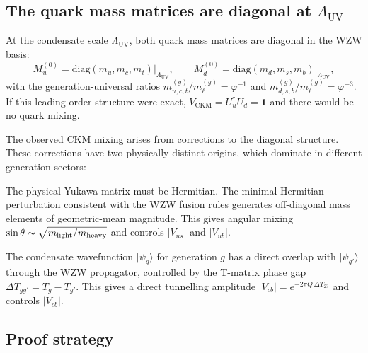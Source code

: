 \documentclass[11pt,a4paper]{article}
\theoremstyle{definition}
\theoremstyle{remark}
\newcommand{\vp}{\varphi}
\newcommand{\LUV}{\Lambda_{\mathrm{UV}}}
\begin{document}
\subsection{The quark mass matrices are diagonal at $\LUV$}
\label{P5:subsec:ckm_diagonal}

At the condensate scale $\LUV$, both quark mass matrices are diagonal
in the WZW basis:
\begin{equation}
  M_u^{(0)} = \mathrm{diag}(m_u,m_c,m_t)\big|_{\LUV}, \qquad
  M_d^{(0)} = \mathrm{diag}(m_d,m_s,m_b)\big|_{\LUV},
  \label{P5:eq:mass_matrices_diag}
\end{equation}
with the generation-universal ratios $m_{u,c,t}^{(g)}/m_\ell^{(g)} = \vp^{-1}$
and $m_{d,s,b}^{(g)}/m_\ell^{(g)} = \vp^{-3}$.
If this leading-order structure were exact, $V_{\mathrm{CKM}} = U_u^\dagger U_d = \mathbf{1}$
and there would be no quark mixing.

The observed CKM mixing arises from corrections to the diagonal structure.
These corrections have two physically distinct origins, which dominate in
different generation sectors:
\begin{description}[noitemsep]
\item[Mechanism~A (Hermitian texture).] The physical Yukawa matrix must be
  Hermitian. The minimal Hermitian perturbation consistent with the WZW fusion
  rules generates off-diagonal mass elements of geometric-mean magnitude.
  This gives angular mixing $\sin\theta \sim \sqrt{m_{\rm light}/m_{\rm heavy}}$
  and controls $|V_{us}|$ and $|V_{ub}|$.
\item[Mechanism~B (WZW condensate overlap).] The condensate wavefunction
  $|\psi_g\rangle$ for generation $g$ has a direct overlap with
  $|\psi_{g'}\rangle$ through the WZW propagator, controlled by
  the T-matrix phase gap $\Delta T_{gg'} = T_g - T_{g'}$.
  This gives a direct tunnelling amplitude $|V_{cb}| = e^{-2\pi Q\,\Delta T_{23}}$
  and controls $|V_{cb}|$.
\end{description}

\subsection{Proof strategy}
\label{P5:subsec:ckm_strategy}
\end{document}
